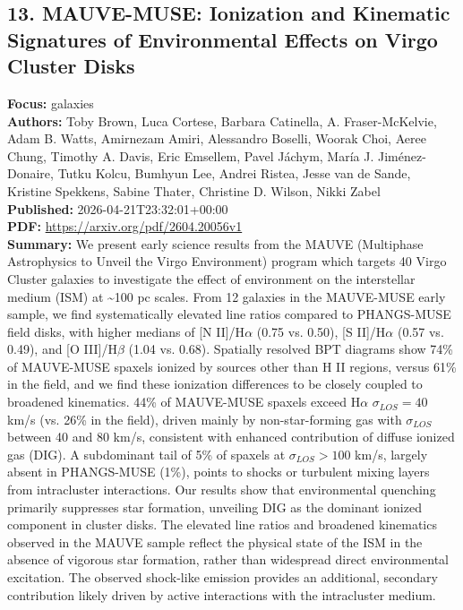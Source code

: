\documentclass[11pt]{article}
\begin{document}
\subsection*{13. MAUVE-MUSE: Ionization and Kinematic Signatures of Environmental Effects on Virgo Cluster Disks}
\textbf{Focus:} galaxies\\
\textbf{Authors:} Toby Brown, Luca Cortese, Barbara Catinella, A. Fraser-McKelvie, Adam B. Watts, Amirnezam Amiri, Alessandro Boselli, Woorak Choi, Aeree Chung, Timothy A. Davis, Eric Emsellem, Pavel Jáchym, María J. Jiménez-Donaire, Tutku Kolcu, Bumhyun Lee, Andrei Ristea, Jesse van de Sande, Kristine Spekkens, Sabine Thater, Christine D. Wilson, Nikki Zabel\\
\textbf{Published:} 2026-04-21T23:32:01+00:00\\
\textbf{PDF:} \href{https://arxiv.org/pdf/2604.20056v1}{https://arxiv.org/pdf/2604.20056v1}\\
\textbf{Summary:}
We present early science results from the MAUVE (Multiphase Astrophysics to Unveil the Virgo Environment) program which targets 40 Virgo Cluster galaxies to investigate the effect of environment on the interstellar medium (ISM) at \textasciitilde{}100 pc scales. From 12 galaxies in the MAUVE-MUSE early sample, we find systematically elevated line ratios compared to PHANGS-MUSE field disks, with higher medians of [N II]/H$\alpha $ (0.75 vs. 0.50), [S II]/H$\alpha $ (0.57 vs. 0.49), and [O III]/H$\beta $ (1.04 vs. 0.68). Spatially resolved BPT diagrams show 74\% of MAUVE-MUSE spaxels ionized by sources other than H II regions, versus 61\% in the field, and we find these ionization differences to be closely coupled to broadened kinematics. 44\% of MAUVE-MUSE spaxels exceed H$\alpha $ $\sigma _{LOS} = 40$ km/s (vs. 26\% in the field), driven mainly by non-star-forming gas with $\sigma _{LOS}$ between 40 and 80 km/s, consistent with enhanced contribution of diffuse ionized gas (DIG). A subdominant tail of 5\% of spaxels at $\sigma _{LOS} > 100$ km/s, largely absent in PHANGS-MUSE (1\%), points to shocks or turbulent mixing layers from intracluster interactions. Our results show that environmental quenching primarily suppresses star formation, unveiling DIG as the dominant ionized component in cluster disks. The elevated line ratios and broadened kinematics observed in the MAUVE sample reflect the physical state of the ISM in the absence of vigorous star formation, rather than widespread direct environmental excitation. The observed shock-like emission provides an additional, secondary contribution likely driven by active interactions with the intracluster medium.
\end{document}
